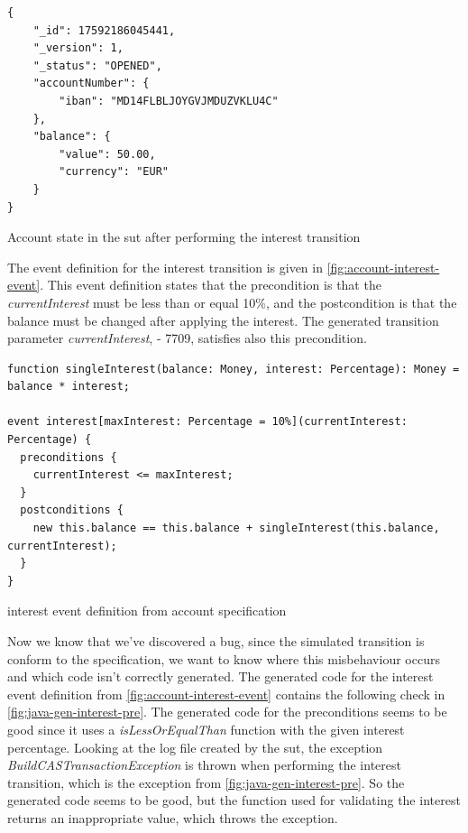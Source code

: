 \begin{sourcecode}[h!]
\begin{lstlisting}[]
{
	"_id": 17592186045441,
	"_version": 1,
	"_status": "OPENED",
	"accountNumber": {
		"iban": "MD14FLBLJOYGVJMDUZVKLU4C"
	},
	"balance": {
		"value": 50.00,
		"currency": "EUR"
	}
}
\end{lstlisting}
\caption{Account state in the \gls{sut} after performing the interest transition}\label{fig:interest-opened-account-json}\end{sourcecode}
\FloatBarrier

The event definition for the interest transition is given in
\autoref{fig:account-interest-event}. This event definition states that the
precondition is that the \textit{currentInterest} must be less than or equal
10\%, and the postcondition is that the balance must be changed after applying
the interest. The generated transition parameter \textit{currentInterest},
- 7709, satisfies also this precondition.

\begin{sourcecode}[h!]
\begin{lstlisting}[]
function singleInterest(balance: Money, interest: Percentage): Money =  balance * interest;

event interest[maxInterest: Percentage = 10%](currentInterest: Percentage) {
  preconditions {
    currentInterest <= maxInterest;
  }
  postconditions {
    new this.balance == this.balance + singleInterest(this.balance, currentInterest);
  }
}
\end{lstlisting}
\caption{interest event definition from account specification}\label{fig:account-interest-event}
\end{sourcecode}
\FloatBarrier

Now we know that we've discovered a bug, since the simulated transition is
conform to the specification, we want to know where this misbehaviour occurs and
which code isn't correctly generated. The generated code for the interest event
definition from \autoref{fig:account-interest-event} contains the following
check in \autoref{fig:java-gen-interest-pre}. The generated code for the
preconditions seems to be good since it uses a \textit{isLessOrEqualThan}
function with the given interest percentage. Looking at the log file created by
the \gls{sut}, the exception \textit{BuildCASTransactionException} is thrown when
performing the interest transition, which is the exception from
\autoref{fig:java-gen-interest-pre}. So the generated code seems to be good, but
the function used for validating the interest returns an inappropriate value,
which throws the exception.

